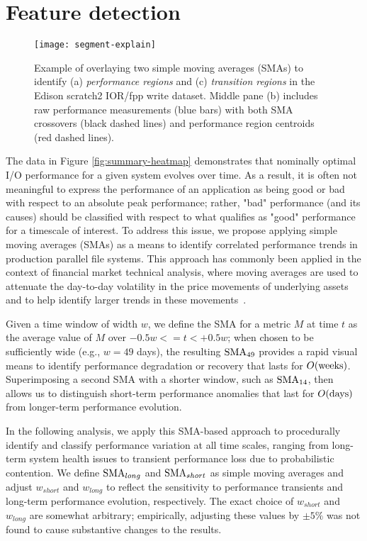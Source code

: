 \section{Feature detection}  \label{sec:features}

\begin{figure}[t]
    \centering
    \texttt{[image: segment-explain]}
    \vspace{-.35in}
    \caption{Example of overlaying two simple moving averages (SMAs) to identify (a) \emph{performance regions} and (c) \emph{transition regions} in the Edison scratch2 IOR/fpp write dataset.  Middle pane (b) includes raw performance measurements (blue bars) with both SMA crossovers (black dashed lines) and performance region centroids (red dashed lines).}
    \label{fig:segment-explain}
\end{figure}

The data in Figure \ref{fig:summary-heatmap} demonstrates that nominally optimal I/O performance for a given system evolves over time.
As a result, it is often not meaningful to express the performance of an application as being good or bad with respect to an absolute peak performance;
rather, "bad" performance (and its causes) should be classified with respect to what qualifies as "good" performance for a timescale of interest.
To address this issue, we propose applying simple moving averages (SMAs) as a means to identify correlated performance trends in production parallel file systems.
This approach has commonly been applied in the context of financial market technical analysis, where moving averages are used to attenuate the day-to-day volatility in the price movements of underlying assets and to help identify larger trends in these movements~\cite{}.

Given a time window of width $w$, we define the SMA for a metric $M$ at time $t$ as the average value of $M$ over ${-0.5w <= t < +0.5w}$;
when chosen to be sufficiently wide (e.g., $w = 49$ days), the resulting $\textup{SMA}_{49}$ provides a rapid visual means to identify performance degradation or recovery that lasts for $O(\textup{weeks})$.  Superimposing a second SMA with a shorter window, such as $\textup{SMA}_{14}$, then allows us to distinguish short-term performance anomalies that last for $O(\textup{days})$ from longer-term performance evolution.

In the following analysis, we apply this SMA-based approach to procedurally identify and classify performance variation at all time scales, ranging from long-term system health issues to transient performance loss due to probabilistic contention.
We define $\textup{SMA}_{long}$ and $\textup{SMA}_{short}$ as simple moving averages and adjust $w_{short}$ and $w_{long}$ to reflect the sensitivity to performance transients and long-term performance evolution, respectively.
The exact choice of $w_{short}$ and $w_{long}$ are somewhat arbitrary; empirically, adjusting these values by $\pm 5 \%$ was not found to cause substantive changes to the results.

